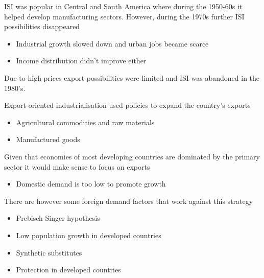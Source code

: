 \documentclass{beamer}
\begin{document}
\begin{frame}
 ISI was popular in Central and South America where during the 1950-60s it helped develop manufacturing sectors.
 However, during the 1970s further ISI possibilities disappeared
 \begin{itemize}
   \item Industrial growth slowed down and urban jobs became scarce
   \item Income distribution didn't improve either
 \end{itemize}
 \medskip
 Due to high prices export possibilities were limited and ISI was abandoned in the 1980's.
\end{frame}


\begin{frame}
  Export-oriented industrialisation used policies to expand the country's exports
  \begin{itemize}
    \item Agricultural commodities and raw materials
    \item Manufactured goods
  \end{itemize}
\end{frame}

\begin{frame}
  Given that economies of most developing countries are dominated by the primary sector it would make sense to focus on exports
  \begin{itemize}
    \item Domestic demand is too low to promote growth
  \end{itemize}
  \medskip
  There are however some foreign demand factors that work against this strategy
  \begin{itemize}
    \item Prebisch-Singer hypothesis
    \item Low population growth in developed countries
    \item Synthetic substitutes
    \item Protection in developed countries
  \end{itemize}
\end{frame}
\end{document}
